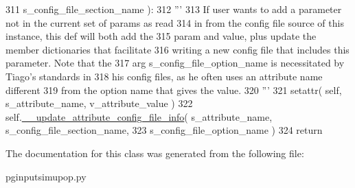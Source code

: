 \begin{DoxyCode}
311             s\_config\_file\_section\_name ):
312         \textcolor{stringliteral}{'''}
313 \textcolor{stringliteral}{        If user wants to add a parameter not in the current set of params as read}
314 \textcolor{stringliteral}{        in from the config file source of this instance, this def will both add the }
315 \textcolor{stringliteral}{        param and value, plus update the member dictionaries that facilitate}
316 \textcolor{stringliteral}{        writing a new config file that includes this parameter.  Note that the}
317 \textcolor{stringliteral}{        arg s\_config\_file\_option\_name is necessitated by Tiago's standards in }
318 \textcolor{stringliteral}{        his config files, as he often uses an attribute name different}
319 \textcolor{stringliteral}{        from the option name that gives the value.}
320 \textcolor{stringliteral}{        '''}
321         setattr( self, s\_attribute\_name, v\_attribute\_value )
322         self.\hyperlink{classnegui_1_1pginputsimupop_1_1PGInputSimuPop_a27abd811d6b6108a9593372c3b0c7881}{\_\_update\_attribute\_config\_file\_info}( s\_attribute\_name, 
      s\_config\_file\_section\_name, 
323                 s\_config\_file\_option\_name )
324         \textcolor{keywordflow}{return}
\end{DoxyCode}


The documentation for this class was generated from the following file\+:\begin{DoxyCompactItemize}
\item 
pginputsimupop.\+py\end{DoxyCompactItemize}
